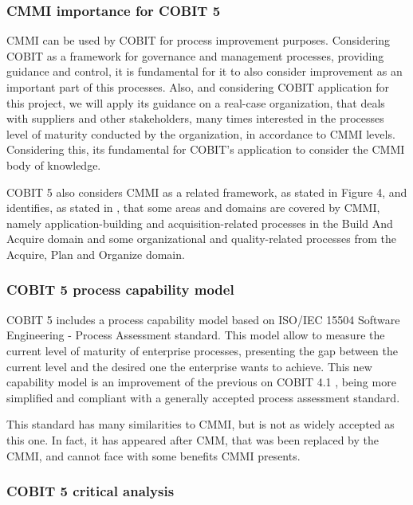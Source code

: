 \subsubsection{CMMI importance for COBIT 5}

CMMI can be used by COBIT for process improvement purposes. Considering COBIT as a framework for governance and management processes, providing guidance and control, it is fundamental for it to also consider improvement as an important part of this processes. Also, and considering COBIT application for this project, we will apply its guidance on a real-case organization, that deals with suppliers and other stakeholders, many times interested in the processes level of maturity conducted by the organization, in accordance to CMMI levels. Considering this, its fundamental for COBIT's application to consider the CMMI body of knowledge.\par
COBIT 5 also considers CMMI as a related framework, as stated in Figure 4, and identifies, as stated in \cite{2012cobit}, that some areas and domains are covered by CMMI, namely application-building and acquisition-related processes in the Build And Acquire domain and some organizational and quality-related processes from the Acquire, Plan and Organize domain.\par


\subsubsection{COBIT 5 process capability model}

COBIT 5 includes a process capability model based on ISO/IEC 15504 Software Engineering - Process Assessment standard.\cite{ISO15504} This model allow to measure the current level of maturity of enterprise processes, presenting the gap between the current level and the desired one the enterprise wants to achieve. This new capability model is an improvement of the previous on COBIT 4.1 \cite{cobit4}, being more simplified and compliant with a generally accepted process assessment standard.\par
This standard has many similarities to CMMI, but is not as widely accepted as this one. In fact, it has appeared after CMM, that was been replaced by the CMMI, and cannot face with some benefits CMMI presents.\par


\subsubsection{COBIT 5 critical analysis}

